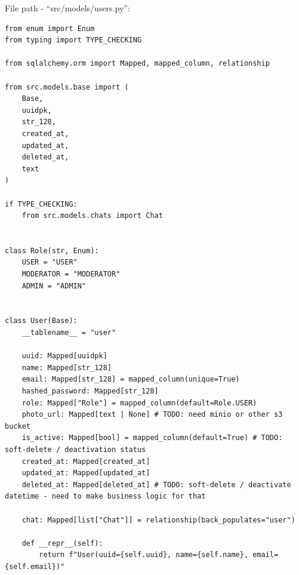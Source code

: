 File path - ``src/models/users.py'':
\begin{lstlisting}
from enum import Enum
from typing import TYPE_CHECKING

from sqlalchemy.orm import Mapped, mapped_column, relationship

from src.models.base import (
    Base,
    uuidpk,
    str_128,
    created_at,
    updated_at,
    deleted_at,
    text
)

if TYPE_CHECKING:
    from src.models.chats import Chat


class Role(str, Enum):
    USER = "USER"
    MODERATOR = "MODERATOR"
    ADMIN = "ADMIN"


class User(Base):
    __tablename__ = "user"

    uuid: Mapped[uuidpk]
    name: Mapped[str_128]
    email: Mapped[str_128] = mapped_column(unique=True)
    hashed_password: Mapped[str_128]
    role: Mapped["Role"] = mapped_column(default=Role.USER)
    photo_url: Mapped[text | None] # TODO: need minio or other s3 bucket
    is_active: Mapped[bool] = mapped_column(default=True) # TODO: soft-delete / deactivation status
    created_at: Mapped[created_at]
    updated_at: Mapped[updated_at]
    deleted_at: Mapped[deleted_at] # TODO: soft-delete / deactivate datetime - need to make business logic for that
    
    chat: Mapped[list["Chat"]] = relationship(back_populates="user")
    
    def __repr__(self):
        return f"User(uuid={self.uuid}, name={self.name}, email={self.email})"
\end{lstlisting}

\clearpage

